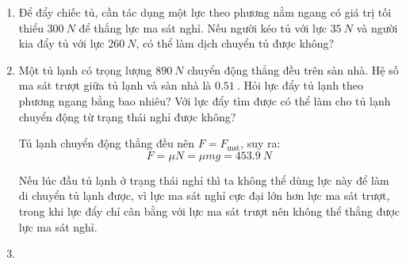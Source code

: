 \begin{enumerate}[label=\bfseries Bài \arabic*:,leftmargin=1.5cm]
	\item {}
	
	{
		Để đẩy chiếc tủ, cần tác dụng một lực theo phương nằm ngang có giá trị tối thiểu $\SI{300}{N}$ để thắng lực ma sát nghỉ. Nếu người kéo tủ với lực $\SI{35}{N}$ và người kia đẩy tủ với lực $\SI{260}{N}$, có thể làm dịch chuyển tủ được không?
	}
	
	
	\item {}
	
	
	{Một tủ lạnh có trọng lượng $\SI{890}{N}$ chuyển động thẳng đều trên sàn nhà. Hệ số ma sát trượt giữa tủ lạnh và sàn nhà là $\SI{0.51}{}$. Hỏi lực đẩy tủ lạnh theo phương ngang bằng bao nhiêu? Với lực đẩy tìm được có thể làm cho tủ lạnh chuyển động từ trạng thái nghỉ được không?
		
	}
	
	\hideall
	{Tủ lạnh chuyển động thẳng đều nên $F=F_\text{mst}$, suy ra:
		$$F=\mu N = \mu mg = \SI{453.9}{N}$$
		
		Nếu lúc đầu tủ lạnh ở trạng thái nghỉ thì ta không thể dùng lực này để làm di chuyển tủ lạnh được, vì lực ma sát nghỉ cực đại lớn hơn lực ma sát trượt, trong khi lực đẩy chỉ cân bằng với lực ma sát trượt nên không thể thắng được lực ma sát nghỉ.
	}
	\item {}
	

\end{enumerate}
